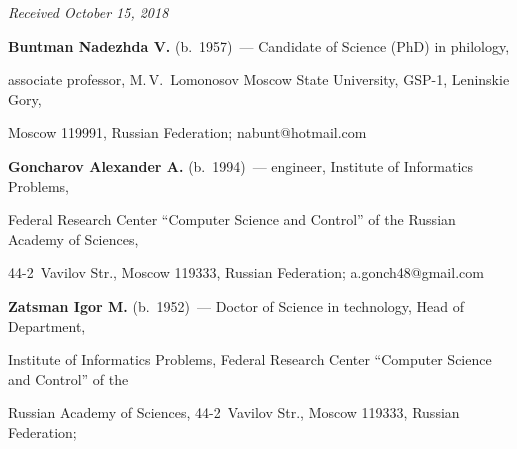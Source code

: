 \vspace*{-6pt}





\hfill{\small\textit{Received October 15, 2018}}















  \Contr


  


  \noindent


  \textbf{Buntman Nadezhda V.} (b.\ 1957)~--- Candidate of Science (PhD) in philology, 


associate professor, M.\,V.~Lomonosov Moscow State University, GSP-1, Leninskie Gory, 


Moscow 119991, Russian Federation; \mbox{nabunt@hotmail.com}


  


  \vspace*{3pt}


  


  \noindent


  \textbf{Goncharov Alexander A.} (b.\ 1994)~--- engineer, Institute of Informatics Problems, 


Federal Research Center ``Computer Science and Control'' of the Russian Academy of Sciences, 


44-2~Vavilov Str., Moscow 119333, Russian Federation; \mbox{a.gonch48@gmail.com}


  


  \vspace*{3pt}


  


  


  \noindent


  \textbf{Zatsman Igor M.} (b.\ 1952)~--- Doctor of Science in technology, Head of Department, 


Institute of Informatics Problems, Federal Research Center ``Computer Science and Control'' of the 


Russian Academy of Sciences, 44-2~Vavilov Str., Moscow 119333, Russian Federation; 


